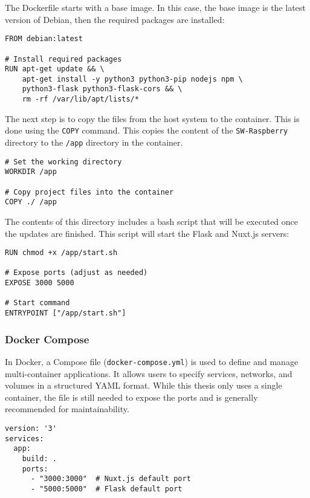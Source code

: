         The Dockerfile starts with a base image. In this case, the
        base image is the latest version of Debian, then the
        required packages are installed:

        \begin{verbatim}
FROM debian:latest

# Install required packages
RUN apt-get update && \
    apt-get install -y python3 python3-pip nodejs npm \
    python3-flask python3-flask-cors && \
    rm -rf /var/lib/apt/lists/*
        \end{verbatim}

        The next step is to copy the files from the host
        system to the container. This is done using the \texttt{COPY}
        command. This copies the content of the \texttt{SW-Raspberry} 
        directory to the \texttt{/app} directory in the container.

        \begin{verbatim}
# Set the working directory
WORKDIR /app

# Copy project files into the container
COPY ./ /app
        \end{verbatim}

        The contents of this directory includes a bash script
        that will be executed once the updates are finished. This
        script will start the Flask and Nuxt.js servers:

        \begin{verbatim}
RUN chmod +x /app/start.sh

# Expose ports (adjust as needed)
EXPOSE 3000 5000

# Start command 
ENTRYPOINT ["/app/start.sh"]
        \end{verbatim}

        \subsubsection{Docker Compose}
        In Docker, a Compose file (\texttt{docker-compose.yml}) is used to 
        define and manage multi-container applications. It allows 
        users to specify services, networks, and volumes in a 
        structured YAML format. While this thesis only uses a single
        container, the file is still needed to expose the ports and
        is generally recommended for maintainability.

        \begin{verbatim}
version: '3'
services:
  app:
    build: .
    ports:
      - "3000:3000"  # Nuxt.js default port
      - "5000:5000"  # Flask default port

        \end{verbatim}
